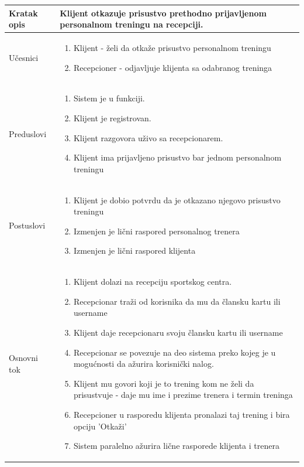 \begin{longtable}{| p{} | p{} |} 
\hline
    Kratak opis & Klijent otkazuje prisustvo prethodno prijavljenom personalnom treningu na recepciji. \\ 
\hline    
    Učesnici &
    \begin{enumerate}
    \item Klijent - želi da otkaže prisustvo personalnom treningu
    \item Recepcioner - odjavljuje klijenta sa odabranog treninga
   \end{enumerate}\\
\hline
   Preduslovi & \begin{enumerate}
    \item Sistem je u funkciji.
    \item Klijent je registrovan.
    \item Klijent razgovora uživo sa recepcionarem.
    \item Klijent ima prijavljeno prisustvo bar jednom personalnom treningu
   \end{enumerate} \\
\hline  
    Postuslovi &
    \begin{enumerate}
    \item Klijent je dobio potvrdu da je otkazano njegovo prisustvo treningu
    \item Izmenjen je lični raspored personalnog trenera
    \item Izmenjen je lični raspored klijenta
   \end{enumerate}\\
\hline
    Osnovni tok & 
    \begin{enumerate}
    \item Klijent dolazi na recepciju sportskog centra.
    \item Recepcionar traži od korisnika da mu da člansku kartu ili username
    \item Klijent daje recepcionaru svoju člansku kartu ili username
    \item Recepcionar se povezuje na deo sistema preko kojeg je u mogućnosti da ažurira korisnički nalog.
    \item Klijent mu govori koji je to trening kom ne želi da prisustvuje - daje mu ime i prezime trenera i termin treninga
    \item Recepcioner u rasporedu klijenta pronalazi taj trening i bira opciju 'Otkaži' 
    \item Sistem paralelno ažurira lične rasporede klijenta i trenera

\end{enumerate}
\end{longtable}
